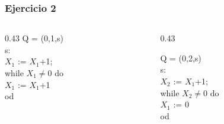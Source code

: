 \documentclass[xcolor=table]{beamer}
\begin{document}
\begin{frame} \frametitle{Ejercicio 2} \small  


\begin{columns}

\begin{column}{0.43\textwidth}
Q = (0,1,s) \\

s: \\
$X_1$ := $X_1$+1; \\
while $X_1 \neq 0 $ do \\
\hspace{0.3cm}$X_1$ := $X_1$+1 \\
od \\


\end{column}

\begin{column}{0.43\textwidth}

Q = (0,2,s) \\

s: \\
$X_2$ := $X_1$+1; \\
while $X_2 \neq 0 $ do \\
\hspace{0.3cm}$X_1$ := 0 \\
od \\
\end{column}

\end{columns}

\end{frame} 
\end{document}
